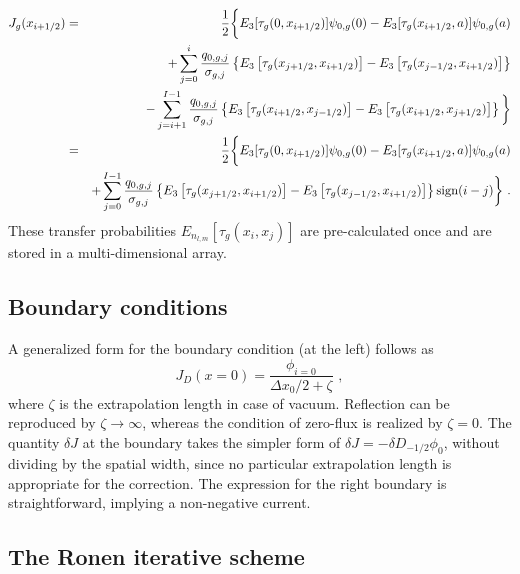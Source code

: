 \begin{eqnarray}\label{eq:tot-J-disc2-l=0}
J_g(x_{i+1/2}) &=& \frac{1}{2}
\bigg\{
E_3[\tau_g(0,x_{i+1/2})] \psi_{0,g}(0) 
- E_3[\tau_g(x_{i+1/2},a)]\psi_{0,g}(a)  \nonumber \\
&&+
\sum\limits_{j=0}^i \frac{q_{0,g,j}}{\sigma_{g,j}} 
\left\{
E_3\left[
\tau_g(x_{j+1/2},x_{i+1/2}) \right] 
- E_3\left[
\tau_g(x_{j-1/2},x_{i+1/2})
\right] 
\right\}
\nonumber \\
&&-
\sum\limits_{j=i+1}^{I-1} \frac{q_{0,g,j}}{\sigma_{g,j}} 
\left\{
E_3\left[
\tau_g(x_{i+1/2},x_{j-1/2}) \right] 
- E_3\left[
\tau_g(x_{i+1/2},x_{j+1/2})
\right]
\right\}
\bigg\}	\nonumber \\
&=&\frac{1}{2}
\bigg\{
E_3[\tau_g(0,x_{i+1/2})] \psi_{0,g}(0) 
- E_3[\tau_g(x_{i+1/2},a)]\psi_{0,g}(a)  \nonumber \\
&&+
\sum\limits_{j=0}^{I-1} \frac{q_{0,g,j}}{\sigma_{g,j}} 
\left\{
E_3\left[
\tau_g(x_{j+1/2},x_{i+1/2}) \right] 
- E_3\left[
\tau_g(x_{j-1/2},x_{i+1/2})
\right] 
\right\}\text{sign}(i-j)
\bigg\}
\,\, . 
\end{eqnarray}
These transfer probabilities $E_{n_{l,m}}[\tau_g(x_i,x_j)]$ are pre-calculated once and are stored in a multi-dimensional array.

%
\subsection{Boundary conditions}
\label{sec:BC}
A generalized form for the boundary condition (at the left) follows as
\begin{equation}\label{eq:BC}
J_D(x=0) = \frac{\phi_{i=0}}{\Delta x_0/2 + \zeta} \,\, ,
\end{equation} 
where $\zeta$ is the extrapolation length in case of vacuum. Reflection can be reproduced by $\zeta\rightarrow\infty$, whereas the condition of zero-flux is realized by $\zeta=0$. 
%
The quantity $\delta J$ at the boundary takes the simpler form of $\delta J = -\delta D_{-1/2}\phi_0$, without dividing by the spatial width, since no particular extrapolation length is appropriate for the correction. The expression for the right boundary is straightforward, implying a non-negative current.

%
\subsection{The Ronen iterative scheme}
\label{sec:RM-scheme}

